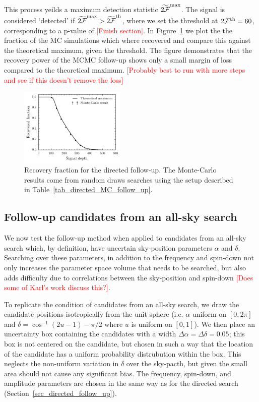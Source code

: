 \documentclass[aps, prd, twocolumn, superscriptaddress, floatfix, showpacs, nofootinbib, longbibliography]{revtex4-1}
\newcommand{\comment}[1]{\textcolor{red}{[#1]}}
\begin{document}
This process yeilds a maximum detection statistic $\widetilde{2{\mathcal{F}}}^{\rm max}$.
The signal is considered `detected' if $\widetilde{2{\mathcal{F}}}^{\rm max} >
\widetilde{2{\mathcal{F}}}^{\rm th}$, where we set the threshold at $2{\mathcal{F}}^{\rm th}=60$,
corresponding to a p-value of \comment{Finish section}.  In
Figure~\ref{fig_directed_MC_follow_up} we plot the the fraction of the MC
simulations which where recovered and compare this against the theoretical
maximum, given the threshold. The figure demonstrates that the recovery power
of the MCMC follow-up shows only a small margin of loss compared to the
theoretical maximum. \comment{Probably best to run with more steps and see if
this doesn't remove the loss}
\begin{figure}[htb]
\centering
\includegraphics[width=0.45\textwidth]{directed_recovery}
\caption{Recovery fraction for the directed follow-up. The Monte-Carlo results
come from random draws searches using the setup described in
Table~\ref{tab_directed_MC_follow_up}.}
\label{fig_directed_MC_follow_up}
\end{figure}


\subsection{Follow-up candidates from an all-sky search}
\label{sec_all_sky_follow_up}

We now test the follow-up method when applied to candidates from an all-sky
search which, by definition, have uncertain sky-position parameters $\alpha$
and $\delta$. Searching over these parameters, in addition to the frequency
and spin-down not only increases the parameter space volume that needs to be
searched, but also adds difficulty due to correlations between the sky-position
and spin-down \comment{Does some of Karl's work discuss this?}.

To replicate the condition of candidates from an all-sky search, we draw the
candidate positions isotropically from the unit sphere (i.e. $\alpha$ uniform
on $[0, 2\pi]$ and $\delta = \cos^{-1}(2u{-}1){- }\pi/2$ where $u$ is uniform
on $[0, 1]$). We then place an uncertainty box containing the candidates with a
width $\Delta\alpha=\Delta\delta=0.05$; this box is not centered on the
candidate, but chosen in such a way that the location of the candidate has a
uniform probability distrubution within the box. This neglects the non-uniform
variation in $\delta$ over the sky-pacth, but given the small area should not
cause any significant bias. The frequency, spin-down, and amplitude parameters
are chosen in the same way as for the directed search
(Section~\ref{sec_directed_follow_up}). 
\end{document}
